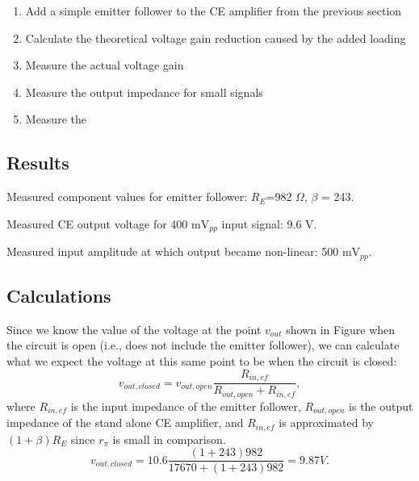 \documentclass[12pt,letterpaper]{report}
\newlength \figwidth
\begin{document}
\begin{enumerate}
\item Add a simple emitter follower to the CE amplifier from the previous section
\item Calculate the theoretical voltage gain reduction caused by the added loading
\item Measure the actual voltage gain
\item Measure the output impedance for small signals
\item Measure the 
\end{enumerate}


\subsection*{Results}

Measured component values for emitter follower:
$R_{E}$=982 $\Omega$,
$\beta$ = 243.

Measured CE output voltage for 400 m$\text{V}_{pp}$ input signal: 9.6 V.

Measured input amplitude at which output became non-linear: 500 m$\text{V}_{pp}$.

\subsection*{Calculations}

Since we know the value of the voltage at the point $v_{out}$ shown in Figure %
when the circuit is open (i.e., does not include the emitter follower), we can calculate what we expect the voltage at this same point to be when the circuit is closed:
$$
v_{out,closed} = v_{out,open}\frac{R_{in,ef}}{R_{out,open}+R_{in,ef}},
$$
where $R_{in,ef}$ is the input impedance of the emitter follower, $R_{out,open}$ is the output impedance of the stand alone CE amplifier, and $R_{in,ef}$ is approximated by $(1+\beta)R_E$ since $r_{\pi}$ is small in comparison.
$$
v_{out,closed} = 10.6 \frac{(1+243)982}{17670+(1+243)982} = 9.87 V.
$$

\end{document}
